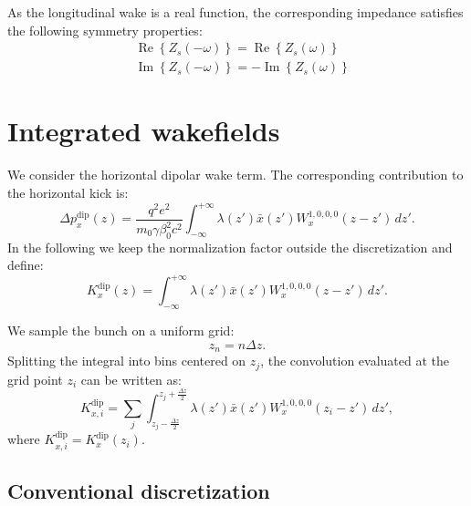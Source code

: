 As the longitudinal wake is a real function, the corresponding impedance satisfies the following symmetry properties:
\begin{align}
&\operatorname{Re}\left\{ Z_{s}( - \omega) \right\}
=
\operatorname{Re}\left\{ Z_s( \omega) \right\}\\
&\operatorname{Im}\left\{ Z_{s}( -\omega) \right\}
=
-\operatorname{Im}\left\{ Z_{s}( \omega) \right\}
\end{align}

\section{Integrated wakefields}

We consider the horizontal dipolar wake term. The corresponding contribution to
the horizontal kick is:
\begin{equation}
    \Delta p_x^\mathrm{dip}(z) =
    \frac{q^2 e^2}{m_0 \gamma \beta_0^2 c^2}
    \int_{-\infty}^{+\infty}
    \lambda(z')\bar{x}(z')W_x^{1,0,0,0}(z-z')\, dz' .
    \label{eq:wake_dipx_kick}
\end{equation}
In the following we keep the normalization factor outside the discretization and
define:
\begin{equation}
    K_x^\mathrm{dip}(z) =
    \int_{-\infty}^{+\infty}
    \lambda(z')\bar{x}(z')W_x^{1,0,0,0}(z-z')\, dz' .
    \label{eq:wake_dipx_conv}
\end{equation}

We sample the bunch on a uniform grid:
\begin{equation}
    z_n = n\Delta z .
\end{equation}
Splitting the integral into bins centered on $z_j$, the convolution evaluated at
the grid point $z_i$ can be written as:
\begin{equation}
    K_{x,i}^\mathrm{dip} =
    \sum_j
    \int_{z_j-\frac{\Delta z}{2}}^{z_j+\frac{\Delta z}{2}}
    \lambda(z')\bar{x}(z')W_x^{1,0,0,0}(z_i-z')\, dz',
    \label{eq:wake_dipx_split_bins}
\end{equation}
where $K_{x,i}^\mathrm{dip}=K_x^\mathrm{dip}(z_i)$.

\subsection*{Conventional discretization}

